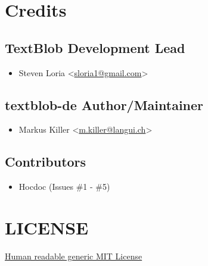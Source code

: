 \documentclass[letterpaper,10pt,english]{sphinxmanual}
\begin{document}
\section{Credits}
\label{authors::doc}\label{authors:credits}

\subsection{TextBlob Development Lead}
\label{authors:textblob-development-lead}\begin{itemize}
\item {} 
Steven Loria \textless{}\href{mailto:sloria1@gmail.com}{sloria1@gmail.com}\textgreater{}

\end{itemize}


\subsection{textblob-de Author/Maintainer}
\label{authors:textblob-de-author-maintainer}\begin{itemize}
\item {} 
Markus Killer \textless{}\href{mailto:m.killer@langui.ch}{m.killer@langui.ch}\textgreater{}

\end{itemize}


\subsection{Contributors}
\label{authors:contributors}\begin{itemize}
\item {} 
Hocdoc (Issues \#1 - \#5)

\end{itemize}


\section{LICENSE}
\label{license::doc}\label{license:textblob-de}\label{license:license}
\href{http://choosealicense.com/licenses/mit/}{Human readable generic MIT License}
\end{document}
